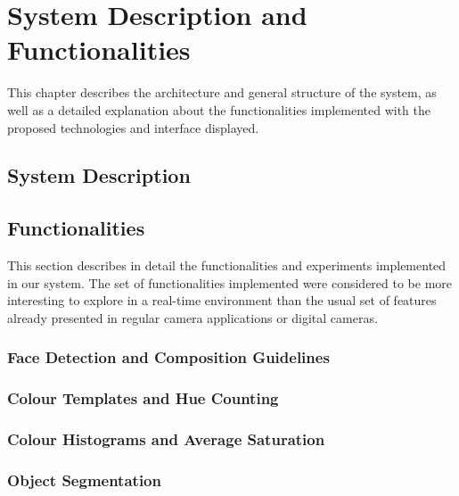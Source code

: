 \chapter{System Description and Functionalities}
\label{cha:system}
This chapter describes the architecture and general structure of the system, as well as a detailed explanation about the functionalities implemented with the proposed technologies and interface displayed.

\section{System Description}
\label{sec:system_description}


\section{Functionalities}
\label{sec:functionalities}

This section describes in detail the functionalities and experiments implemented in our system. The set of functionalities implemented were considered to be more interesting to explore in a real-time environment than the usual set of features already presented in regular camera applications or digital cameras.

\subsection{Face Detection and Composition Guidelines}
\label{sub:face_guidelines}



\subsection{Colour Templates and Hue Counting}
\label{sub:color}


\subsection{Colour Histograms and Average Saturation}
\label{sub:histograms}

\subsection{Object Segmentation}
\label{sub:segmentation}

